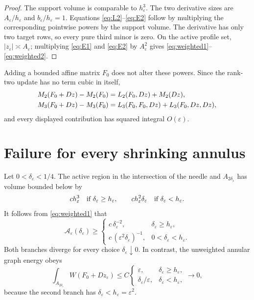 \documentclass[10pt]{article}
\newcommand{\cA}{\mathcal A}
\begin{document}
\begin{proof}
The support volume is comparable to $h_\varepsilon^3$.  The two derivative
sizes are $A_\varepsilon/h_\varepsilon$ and
$b_\varepsilon/h_\varepsilon=1$.  Equations
\eqref{eq:L2}--\eqref{eq:E2} follow by multiplying the corresponding
pointwise powers by the support volume.  The derivative has only two target
rows, so every pure third minor is zero.  On the active profile set,
$|z_\varepsilon|\asymp A_\varepsilon$; multiplying
\eqref{eq:E1} and \eqref{eq:E2} by $A_\varepsilon^2$ gives
\eqref{eq:weighted1}--\eqref{eq:weighted2}.
\end{proof}

Adding a bounded affine matrix $F_0$ does not alter these powers.  Since the
rank-two update has no term cubic in itself,
\begin{align}
 M_2(F_0+Dz)-M_2(F_0)&=L_2(F_0,Dz)+M_2(Dz),\notag\\
 M_3(F_0+Dz)-M_3(F_0)&=L_3(F_0,F_0,Dz)
 +L_3(F_0,Dz,Dz),                                    \label{eq:minor-expand}
\end{align}
and every displayed contribution has squared integral $O(\varepsilon)$.

\section{Failure for every shrinking annulus}

Let $0<\delta_\varepsilon<1/4$.  The active region in the intersection of
the needle and $A_{2\delta_\varepsilon}$ has volume bounded below by
\[
 c h_\varepsilon^3\quad\hbox{if }\delta_\varepsilon\geq h_\varepsilon,
 \qquad
 c h_\varepsilon^2\delta_\varepsilon
 \quad\hbox{if }\delta_\varepsilon<h_\varepsilon .
\]
It follows from \eqref{eq:weighted1} that
\begin{equation}
 \cA_\varepsilon(\delta_\varepsilon)\geq
 \begin{cases}
 c\,\delta_\varepsilon^{-2},
   &\delta_\varepsilon\geq h_\varepsilon,\\[1mm]
 c\,(\varepsilon^2\delta_\varepsilon)^{-1},
   &0<\delta_\varepsilon<h_\varepsilon.
 \end{cases}                                           \label{eq:all-delta}
\end{equation}
Both branches diverge for every choice
$\delta_\varepsilon\downarrow0$.  In contrast, the unweighted annular graph
energy obeys
\begin{equation}
 \int_{A_{2\delta_\varepsilon}}W(F_0+Dz_\varepsilon)
 \leq C
 \begin{cases}
 \varepsilon,&\delta_\varepsilon\geq h_\varepsilon,\\
 \delta_\varepsilon/\varepsilon,
    &\delta_\varepsilon<h_\varepsilon,
 \end{cases}
 \longrightarrow0,                                    \label{eq:ann-energy}
\end{equation}
because the second branch has
$\delta_\varepsilon<h_\varepsilon=\varepsilon^2$.
\end{document}
